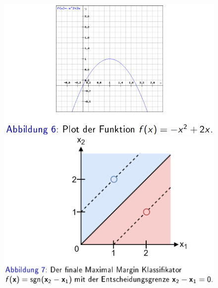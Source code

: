 \documentclass{report}
\begin{document}
  \begin{figure}[H]	
    \centering	
    \begin{minipage}[b]{0.4\textwidth}	
      \includegraphics[scale=.265]{ml06_6}	
    \end{minipage}	
    \hfill	
    \begin{minipage}[b]{0.4\textwidth}	
      \includegraphics[scale=.275]{ml06_7}	
    \end{minipage}	
  \end{figure}	
  
\end{document}
